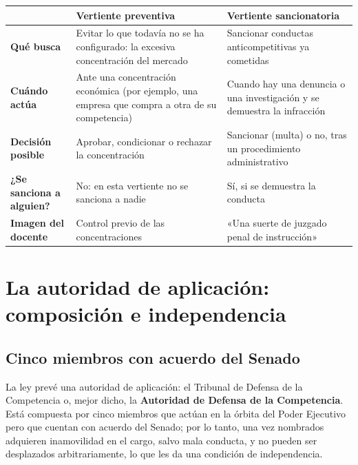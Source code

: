 \documentclass[12pt,oneside]{book}
\begin{document}
\begin{table}[H]
\centering
\renewcommand{\arraystretch}{1.25}
\begin{tabularx}{\textwidth}{
    >{\raggedright\arraybackslash}p{}
    >{\raggedright\arraybackslash}X
    >{\raggedright\arraybackslash}X
}
\toprule
 & \textbf{Vertiente preventiva} & \textbf{Vertiente sancionatoria} \\
\midrule
\textbf{Qué busca} & Evitar lo que todavía no se ha configurado: la excesiva concentración del mercado & Sancionar conductas anticompetitivas ya cometidas \\
\textbf{Cuándo actúa} & Ante una concentración económica (por ejemplo, una empresa que compra a otra de su competencia) & Cuando hay una denuncia o una investigación y se demuestra la infracción \\
\textbf{Decisión posible} & Aprobar, condicionar o rechazar la concentración & Sancionar (multa) o no, tras un procedimiento administrativo \\
\textbf{¿Se sanciona a alguien?} & No: en esta vertiente no se sanciona a nadie & Sí, si se demuestra la conducta \\
\textbf{Imagen del docente} & Control previo de las concentraciones & «Una suerte de juzgado penal de instrucción» \\
\bottomrule
\end{tabularx}
\end{table}

\section{La autoridad de aplicación: composición e independencia}

\subsection{Cinco miembros con acuerdo del Senado}

La ley prevé una autoridad de aplicación: el Tribunal de Defensa de la Competencia o, mejor dicho, la \textbf{Autoridad de Defensa de la Competencia}. Está compuesta por cinco miembros que actúan en la órbita del Poder Ejecutivo pero que cuentan con acuerdo del Senado; por lo tanto, una vez nombrados adquieren inamovilidad en el cargo, salvo mala conducta, y no pueden ser desplazados arbitrariamente, lo que les da una condición de independencia.
\end{document}
